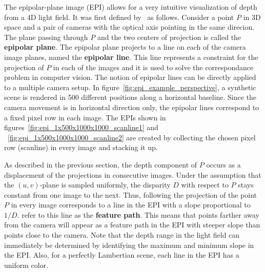 The epipolar-plane image (EPI) allows for a very intuitive visualization of depth from a 4D light field.
It was first defined by~\cite{EPI} as follows.
Consider a point $P$ in 3D space and a pair of cameras with the optical axis pointing in the same direcion.
The plane passing through $P$ and the two centers of projection is called the \textbf{epipolar plane}.
The epipolar plane projects to a line on each of the camera image planes, named the \textbf{epipolar line}.
This line represents a constraint for the projection of $P$ in each of the images and it is used to solve the correspondance problem in computer vision.
The notion of epipolar lines can be directly applied to a multiple camera setup.
In figure~\ref{fig:epi_example_perspective}, a synthetic scene is rendered in 500 different positions along a horizontal baseline.
Since the camera movement is in horizontal direction only, the epipolar lines correspond to a fixed pixel row in each image.
The EPIs shown in figures~\ref{fig:epi_1x500x1000x1000_scanline1} and ~\ref{fig:epi_1x500x1000x1000_scanline2} are created by collecting the chosen pixel row (scanline) in every image and stacking it up.

As described in the previous section, the depth component of $P$ occurs as a displacement of the projections in consecutive images.
Under the assumption that the $(u, v)$-plane is sampled uniformly, the disparity $D$ with respect to $P$ stays constant from one image to the next.
Thus, following the projection of the point $P$ in every image corresponds to a line in the EPI with a slope proportional to $1 / D$.
\cite{EPI} refer to this line as the \textbf{feature path}.
This means that points farther away from the camera will appear as a feature path in the EPI with steeper slope than points close to the camera.
Note that the depth range in the light field can immediately be determined by identifying the maximum and minimum slope in the EPI.
Also, for a perfectly Lambertian scene, each line in the EPI has a uniform color.

